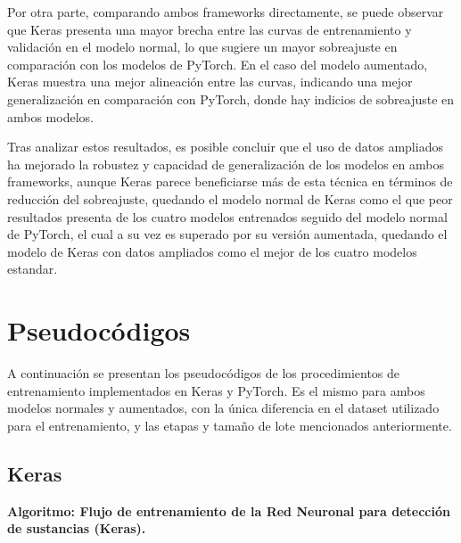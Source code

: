 Por otra parte, comparando ambos frameworks directamente, se puede observar que Keras presenta una mayor brecha entre las curvas de entrenamiento y validación en el modelo normal, lo que sugiere un mayor sobreajuste en comparación con los modelos de PyTorch. En el caso del modelo aumentado, Keras muestra una mejor alineación entre las curvas, indicando una mejor generalización en comparación con PyTorch, donde hay indicios de sobreajuste en ambos modelos.
\par

Tras analizar estos resultados, es posible concluir que el uso de datos ampliados ha mejorado la robustez y capacidad de generalización de los modelos en ambos frameworks, aunque Keras parece beneficiarse más de esta técnica en términos de reducción del sobreajuste, quedando el modelo normal de Keras como el que peor resultados presenta de los cuatro modelos entrenados seguido del modelo normal de PyTorch, el cual a su vez es superado por su versión aumentada, quedando el modelo de Keras con datos ampliados como el mejor de los cuatro modelos estandar.

\section{Pseudocódigos}
A continuación se presentan los pseudocódigos de los procedimientos de entrenamiento implementados en Keras y PyTorch. Es el mismo para ambos modelos normales y aumentados, con la única diferencia en el dataset utilizado para el entrenamiento, y las etapas y tamaño de lote mencionados anteriormente.

\subsection{Keras}

\noindent\textbf{Algoritmo: Flujo de entrenamiento de la Red Neuronal para detección de sustancias (Keras).}


